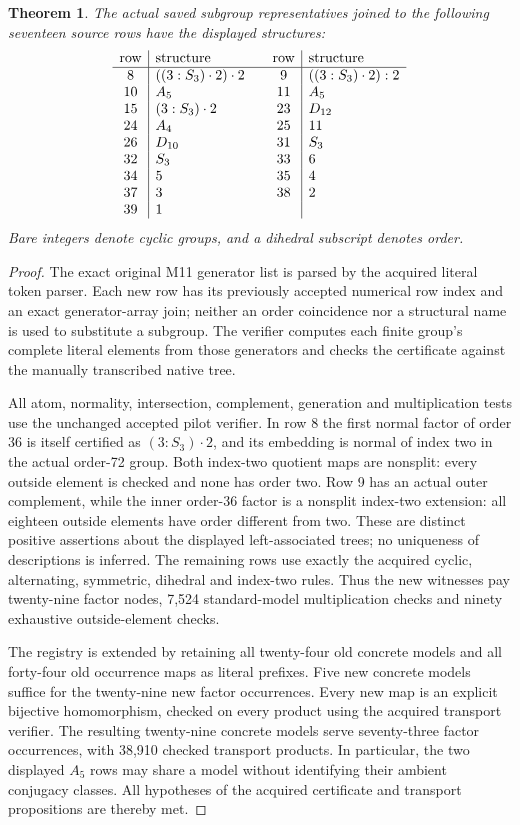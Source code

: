 \documentclass[10pt]{article}
\newtheorem{theorem}{Theorem}
\begin{document}
\begin{theorem}
The actual saved subgroup representatives joined to the following seventeen
source rows have the displayed structures:
\[
\begin{array}{c|l@{\qquad}c|l}
\text{row}&\text{structure}&\text{row}&\text{structure}\\\hline
8&((3:S_3)\cdot2)\cdot2&9&((3:S_3)\cdot2):2\\
10&A_5&11&A_5\\
15&(3:S_3)\cdot2&23&D_{12}\\
24&A_4&25&11\\
26&D_{10}&31&S_3\\
32&S_3&33&6\\
34&5&35&4\\
37&3&38&2\\
39&1&&
\end{array}
\]
Bare integers denote cyclic groups, and a dihedral subscript denotes order.
\end{theorem}
\begin{proof}
The exact original M11 generator list is parsed by the acquired literal token
parser. Each new row has its previously accepted numerical row index and an
exact generator-array join; neither an order coincidence nor a structural
name is used to substitute a subgroup. The verifier computes each finite
group's complete literal elements from those generators and checks the
certificate against the manually transcribed native tree.

All atom, normality, intersection, complement, generation and multiplication
tests use the unchanged accepted pilot verifier. In row 8 the first normal
factor of order 36 is itself certified as $(3:S_3)\cdot2$, and its embedding
is normal of index two in the actual order-72 group. Both index-two quotient
maps are nonsplit: every outside element is checked and none has order two.
Row 9 has an actual outer complement, while the inner order-36 factor is a nonsplit index-two extension: all eighteen outside elements have order different from two.
These are distinct positive assertions about the displayed left-associated
trees; no uniqueness of descriptions is inferred. The remaining rows use
exactly the acquired cyclic, alternating, symmetric, dihedral and index-two
rules. Thus the new witnesses pay twenty-nine factor nodes, 7,524 standard-model
multiplication checks and ninety exhaustive outside-element checks.

The registry is extended by retaining all twenty-four old concrete models
and all forty-four old occurrence maps as literal prefixes. Five new
concrete models suffice for the twenty-nine new factor occurrences. Every new
map is an explicit bijective homomorphism, checked on every product using
the acquired transport verifier. The resulting twenty-nine concrete models
serve seventy-three factor occurrences, with 38,910 checked transport
products. In particular, the two displayed $A_5$ rows may share a model
without identifying their ambient conjugacy classes. All hypotheses of
the acquired certificate and transport propositions are thereby met.
\end{proof}
\end{document}
